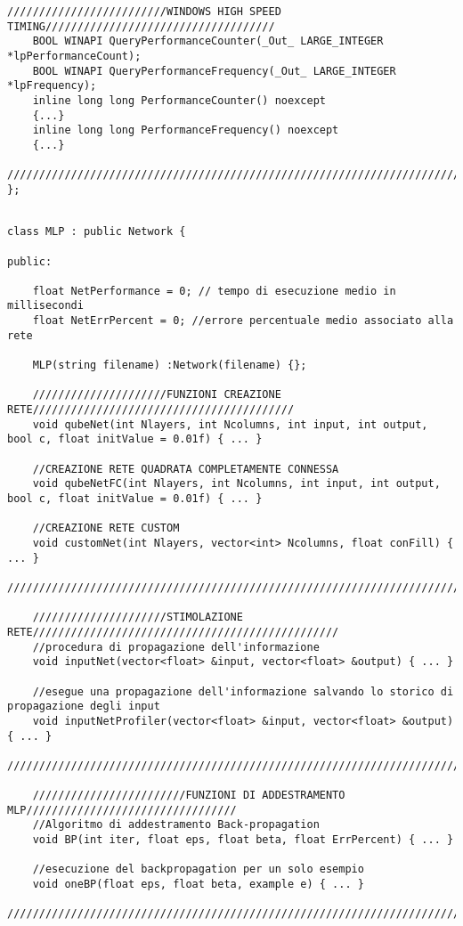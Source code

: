 \documentclass[10pt,a4paper]{article}
\begin{document}
\begin{lstlisting}[style=mycuda, caption=class Network, captionpos=b]
	/////////////////////////WINDOWS HIGH SPEED TIMING////////////////////////////////////
	BOOL WINAPI QueryPerformanceCounter(_Out_ LARGE_INTEGER *lpPerformanceCount);
	BOOL WINAPI QueryPerformanceFrequency(_Out_ LARGE_INTEGER *lpFrequency);
	inline long long PerformanceCounter() noexcept
	{...}
	inline long long PerformanceFrequency() noexcept
	{...}
	//////////////////////////////////////////////////////////////////////////////////////
};

\end{lstlisting}

\begin{lstlisting}[style=mycuda, caption=class MLP, captionpos=b]

class MLP : public Network {

public:

	float NetPerformance = 0; // tempo di esecuzione medio in millisecondi
	float NetErrPercent = 0; //errore percentuale medio associato alla rete

	MLP(string filename) :Network(filename) {};

	/////////////////////FUNZIONI CREAZIONE RETE/////////////////////////////////////////
	void qubeNet(int Nlayers, int Ncolumns, int input, int output, bool c, float initValue = 0.01f) { ... }
	
	//CREAZIONE RETE QUADRATA COMPLETAMENTE CONNESSA
	void qubeNetFC(int Nlayers, int Ncolumns, int input, int output, bool c, float initValue = 0.01f) { ... }
	
	//CREAZIONE RETE CUSTOM
	void customNet(int Nlayers, vector<int> Ncolumns, float conFill) { ... }
	//////////////////////////////////////////////////////////////////////////////////////
	
	/////////////////////STIMOLAZIONE RETE////////////////////////////////////////////////
	//procedura di propagazione dell'informazione
	void inputNet(vector<float> &input, vector<float> &output) { ... }
	
	//esegue una propagazione dell'informazione salvando lo storico di propagazione degli input
	void inputNetProfiler(vector<float> &input, vector<float> &output) { ... }
	//////////////////////////////////////////////////////////////////////////////////////
	
	////////////////////////FUNZIONI DI ADDESTRAMENTO MLP/////////////////////////////////
	//Algoritmo di addestramento Back-propagation
	void BP(int iter, float eps, float beta, float ErrPercent) { ... }
	
	//esecuzione del backpropagation per un solo esempio
	void oneBP(float eps, float beta, example e) { ... }
	//////////////////////////////////////////////////////////////////////////////////////
	

\end{lstlisting}
\end{document}
